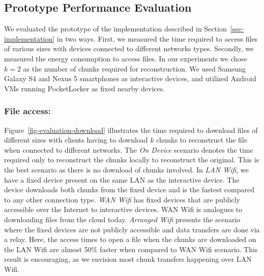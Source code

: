 \subsection{Prototype Performance Evaluation}

We evaluated the prototype of the implementation described in
Section~\ref{sec-implementation} in two ways. First, we measured the time
required to access files of various sizes with devices connected to different
networks types. Secondly, we measured the energy consumption to access files.
In our experiments we chose $k=2$ as the number of chunks required for
reconstruction. We used Samsung Galaxy S4 and Nexus 5 smartphones as
interactive devices, and utilized Android VMs running PocketLocker as fixed
nearby devices.

\subsubsection{File access:\space} \label{sec-fileaccess}
Figure~\ref{fig-evaluation-download} illustrates the time required to
download files of different sizes with clients having to download $k$ chunks
to reconstruct the file when connected to different networks. The \textit{On
Device} scenario denotes the time required only to reconstruct the chunks
locally to reconstruct the original. This is the best scenario as there is no
download of chunks involved. In \textit{LAN Wifi}, we have a fixed device
present on the same LAN as the interactive device. The device downloads both
chunks from the fixed device and is the fastest compared to any other
connection type. \textit{WAN Wifi} has fixed devices that are publicly
accessible over the Internet to interactive devices. WAN Wifi is analogues to
downloading files from the cloud today. \textit{Arranged Wifi} presents the
scenario where the fixed devices are not publicly accessible and data
transfers are done via a relay. Here, the access times to open a file when
the chunks are downloaded on the LAN Wifi are almost 50\% faster when
compared to WAN Wifi scenario. This result is encouraging, as we envision
most chunk transfers happening over LAN Wifi.

